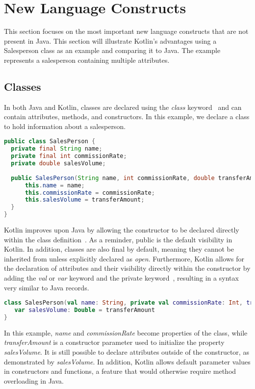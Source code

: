 \documentclass[a4paper, 11pt]{article}
\begin{document}
\section{New Language Constructs} %
This section focuses on the most important new language constructs that are not present in Java. 
This section will illustrate Kotlin's advantages using a Salesperson class as an example and comparing it to Java.
The example represents a salesperson containing multiple attributes.
\subsection{Classes}
In both Java and Kotlin, classes are declared using the \textit{class} keyword~\cite{classes} and can contain attributes, methods, and constructors. In this example, we declare a class to hold information about a salesperson.

\begin{lstlisting}[language=Java,title={Java Class Declaration}]
public class SalesPerson {
  private final String name;
  private final int commissionRate;
  private double salesVolume;
  
  public SalesPerson(String name, int commissionRate, double transferAmount) {
      this.name = name;
      this.commissionRate = commissionRate;
      this.salesVolume = transferAmount;
  }
}
\end{lstlisting}

Kotlin improves upon Java by allowing the constructor to be declared directly within the class definition~\cite{classes-constructors}. As a reminder, public is the default visibility in Kotlin. In addition, classes are also final by default, meaning they cannot be inherited from unless explicitly declared as \textit{open}.
Furthermore, Kotlin allows for the declaration of attributes and their visibility directly within the constructor by adding the \textit{val} or \textit{var} keyword and the private keyword~\cite{classes-constructors}, resulting in a syntax very similar to Java records.

\begin{lstlisting}[language=Kotlin,title={Kotlin Class Declaration}]
class SalesPerson(val name: String, private val commissionRate: Int, transferAmount: Double = 0.0) {
   var salesVolume: Double = transferAmount
}
\end{lstlisting}

In this example, \textit{name} and \textit{commissionRate} become properties of the class, while \textit{transferAmount} is a constructor parameter used to initialize the property \textit{salesVolume}. It is still possible to declare attributes outside of the constructor, as demonstrated by \textit{salesVolume}. 
In addition, Kotlin allows default parameter values in constructors and functions, a feature that would otherwise require method overloading in Java.
\end{document}
